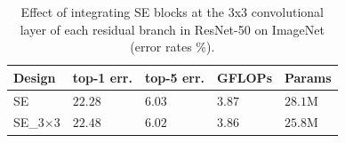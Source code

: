 
\begin{table}[t]
\renewcommand\arraystretch{1.1}
\caption{Effect of integrating SE blocks at the 3x3 convolutional layer of each residual branch in ResNet-50 on ImageNet (error rates \%).}
\label{tab:effect_se3x3}
\vspace{-1.7em}
\begin{center}
\begin{tabular}{l|p{1.2cm}<{\centering}|p{1.2cm}<{\centering}|p{1.2cm} <{\centering}|p{1.2cm} <{\centering}}
\hline
Design & top-1 err. & top-5 err. & GFLOPs & Params\\
\hline
SE & $22.28$  &  $6.03$ & $3.87$ & $28.1$M\\
SE\_3$\times$3 & $22.48$ & $6.02$ & $3.86$ & $25.8$M\\
\hline
\end{tabular}
\end{center}
\end{table}
